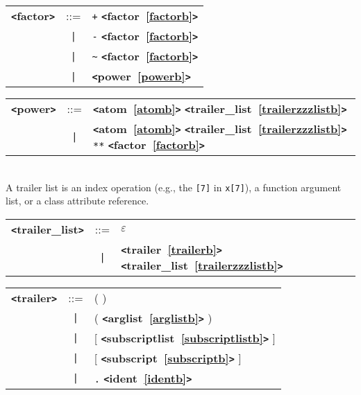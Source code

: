 \documentclass[12pt]{article}
\begin{document}
\label{factorb}
\begin{tabular}{lcl}
{\bf \verb+<+factor\verb+>+} & ::=  & \verb|+| {\bf \verb+<+factor~\ref{factorb}\verb+>+}  \\
 & \verb+|+  & \verb|-| {\bf \verb+<+factor~\ref{factorb}\verb+>+}  \\
 & \verb+|+  & \verb|~| {\bf \verb+<+factor~\ref{factorb}\verb+>+}  \\
 & \verb+|+  & {\bf \verb+<+power~\ref{powerb}\verb+>+}  \\
\end{tabular}

\label{powerb}
\begin{tabular}{lcl}
{\bf \verb+<+power\verb+>+} & ::=  & {\bf \verb+<+atom~\ref{atomb}\verb+>+}  {\bf \verb+<+trailer\_list~\ref{trailerzzzlistb}\verb+>+}  \\
 & \verb+|+  & {\bf \verb+<+atom~\ref{atomb}\verb+>+}  {\bf \verb+<+trailer\_list~\ref{trailerzzzlistb}\verb+>+}  \verb|**| {\bf \verb+<+factor~\ref{factorb}\verb+>+}  \\
\end{tabular} \\

A trailer list is an index operation (e.g., the \verb|[7]| in \verb|x[7]|), a function argument list, or a class attribute reference.

\label{trailerzzzlistb}
\begin{tabular}{lcl}
{\bf \verb+<+trailer\_list\verb+>+} & ::=  & $\varepsilon$ \\
 & \verb+|+  & {\bf \verb+<+trailer~\ref{trailerb}\verb+>+}  {\bf \verb+<+trailer\_list~\ref{trailerzzzlistb}\verb+>+}  \\
\end{tabular}

\label{trailerb}
\begin{tabular}{lcl}
{\bf \verb+<+trailer\verb+>+} & ::=  & ( ) \\
 & \verb+|+  & ( {\bf \verb+<+arglist~\ref{arglistb}\verb+>+}  ) \\
 & \verb+|+  & [ {\bf \verb+<+subscriptlist~\ref{subscriptlistb}\verb+>+}  ] \\
 & \verb+|+  & [ {\bf \verb+<+subscript~\ref{subscriptb}\verb+>+}  ] \\
 & \verb+|+  & \verb|.| {\bf \verb+<+ident~\ref{identb}\verb+>+}  \\
\end{tabular}
\end{document}
